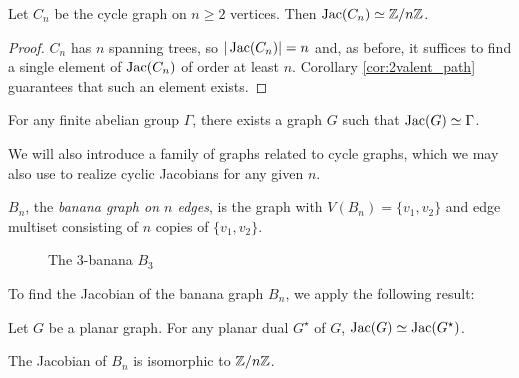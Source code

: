 \documentclass{amsart}
\begin{document}
\begin{cor}
  \label{prop:cycle_cyclic}
  Let $C_n$ be the cycle graph on $n \ge 2$ vertices. Then $\operatorname{Jac}(C_n) \simeq
  \mathbb{Z}/n\mathbb{Z}$.
\end{cor}
\begin{proof}
$C_n$ has $n$ spanning trees, so $|\operatorname{Jac}(C_n)|=n$ and, as before, it
suffices to find a single element of $\operatorname{Jac}(C_n)$ of order at least
$n$. Corollary \ref{cor:2valent_path} guarantees that such an element
exists.
\end{proof}

\begin{cor}\cite[Corollary 1.3]{CR2000}
  For any finite abelian group $\Gamma$, there exists a graph $G$ such
  that $\operatorname{Jac}(G) \simeq \Gamma$. 
\end{cor}

We will also introduce a family of graphs related to cycle graphs,
which we may also use to realize cyclic Jacobians for any given $n$.

\begin{defn}
  $B_n$, the \emph{banana graph on $n$ edges}, is the graph with
  $V(B_n) = \{v_1, v_2\}$ and edge multiset consisting of $n$ copies of
  $\{v_1, v_2\}$.
\end{defn}

\begin{figure}[h]
  \begin{center}
    \caption{The $3$-banana $B_3$}
  \end{center}
\end{figure}

To find the Jacobian of the banana graph $B_n$, we apply the following
result:

\begin{thm}\cite[Theorem 2]{CR2000}
  \label{thm:graph_dual_iso}
  Let $G$ be a planar graph. For any planar dual $G^\star$ of $G$,
  $\operatorname{Jac}(G) \simeq \operatorname{Jac}(G^\star)$.
\end{thm}

\begin{prop}
  \label{prop:banana_cyclic}
  The Jacobian of $B_n$ is isomorphic to $\mathbb{Z}/n\mathbb{Z}$.
\end{prop}
\end{document}
